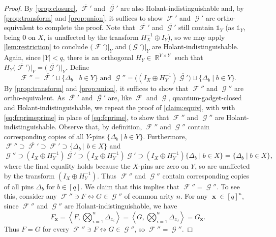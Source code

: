 \documentclass{article}
\theoremstyle{remark}
\theoremstyle{definition}
\DeclareMathOperator{\rr}{\mathbb{R}}
\DeclareMathOperator{\vx}{\mathbf{x}}
\DeclareMathOperator{\fc}{\mathcal{F}}
\DeclareMathOperator{\gc}{\mathcal{G}}
\begin{document}
\begin{proof}
    By \autoref{prop:closure}, $\overline{\fc'}$ and $\overline{\gc'}$ are also Holant-indistinguishable
    and, by \autoref{prop:transform} and \autoref{prop:union}, 
    it suffices to show $\overline{\fc'}$ and $\overline{\gc'}$ are
    ortho-equivalent to complete the proof. 
    Note that $\overline{\fc'}$ 
    and $\overline{\gc'}$ still contain $\mathds{1}_Y$ (as $\mathds{1}_Y$, being 0 on $X$, is unaffected
    by the transform $H_X^{-1} \oplus I_Y$), so we may
    apply \autoref{lem:restriction} to conclude
    $\big(\overline{\fc'}\big)\big|_Y$ and $\big(\overline{\gc'}\big)\big|_Y$ are Holant-indistinguishable. 
    Again, since $|Y| < q$, there is an orthogonal
    $H_Y \in \rr^{Y \times Y}$ such that $H_Y\big(\overline{\fc'}\big)\big|_Y = \big(\overline{\gc'}\big)\big|_Y$. Define
    \begin{equation}
        \fc'' = \overline{\fc'} \sqcup \{\Delta_b \mid b \in Y\} \text{ and }
        \gc'' = \big((I_X \oplus H_Y^{-1}) \overline{\gc'} \big) \sqcup \{\Delta_b \mid b \in Y\}.
    \label{eq:fcprimeprime}
    \end{equation}
    By \autoref{prop:transform} and \autoref{prop:union}, it suffices to show that $\fc''$ and $\gc''$
    are ortho-equivalent. 
    As $\overline{\fc'}$ and $\overline{\gc'}$ are, like $\fc$ and $\gc$, quantum-gadget-closed and 
    Holant-indistinguishable, we repeat the proof of \autoref{claim:equiv}, with 
    with \eqref{eq:fcprimeprime} in place of \eqref{eq:fcprime}, to show that
    $\fc''$ and $\gc''$ are Holant-indistinguishable.
    Observe that, by definition, $\fc''$ and $\gc''$ contain corresponding
    copies of all $Y$-pins $\{\Delta_b \mid b \in Y\}$.
    Furthermore, $\fc'' \supset \overline{\fc'} \supset \fc' \supset \{\Delta_b \mid b \in X\}$
    and 
    \[
        \gc'' \supset (I_X \oplus H_Y^{-1})\overline{\gc'} \supset (I_X \oplus H_Y^{-1})\gc' \supset (I_X \oplus H_Y^{-1})\{\Delta_b \mid b \in X\} = \{\Delta_b \mid b \in X\},
    \]
    where the final equality holds because the $X$-pins are zero on $Y$, so are unaffected by the
    transform $(I_X \oplus H_Y^{-1})$. Thus $\fc''$ and $\gc''$ contain corresponding copies of all
    pins $\Delta_b$ for $b \in [q]$. 
    We claim that this implies that $\fc'' = \gc''$.
    To see this, consider any $\fc'' \ni F \leftrightsquigarrow G \in \gc''$
    of common arity $n$. For any $\vx \in [q]^n$, since $\fc''$ and $\gc''$ are Holant-indistinguishable, 
    we have
    \[
        F_{\vx} = \left\langle F,\bigotimes_{i=1}^n \Delta_{x_i} \right\rangle 
        = \left\langle G,\bigotimes_{i=1}^n \Delta_{x_i} \right\rangle = G_{\vx}.
    \]
    Thus $F = G$ for every $\fc'' \ni F \leftrightsquigarrow G \in \gc''$, so $\fc'' = \gc''$.
\end{proof}
\end{document}
